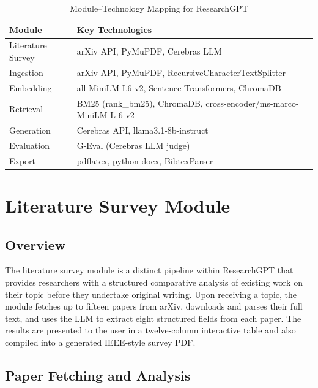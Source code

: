 \documentclass[12pt, a4paper]{article}
\begin{document}
\begin{table}[h]
  \centering
  \caption{Module--Technology Mapping for ResearchGPT}
  \label{tab:modules}
  \begin{tabularx}{\linewidth}{lX}
    \toprule
    \textbf{Module} & \textbf{Key Technologies} \\
    \midrule
    Literature Survey   & arXiv API, PyMuPDF, Cerebras LLM \\
    Ingestion           & arXiv API, PyMuPDF, RecursiveCharacterTextSplitter \\
    Embedding           & all-MiniLM-L6-v2, Sentence Transformers, ChromaDB \\
    Retrieval           & BM25 (rank\_bm25), ChromaDB, cross-encoder/ms-marco-MiniLM-L-6-v2 \\
    Generation          & Cerebras API, llama3.1-8b-instruct \\
    Evaluation          & G-Eval (Cerebras LLM judge) \\
    Export              & pdflatex, python-docx, BibtexParser \\
    \bottomrule
  \end{tabularx}
\end{table}

\section{Literature Survey Module}

\subsection{Overview}

The literature survey module is a distinct pipeline within ResearchGPT that
provides researchers with a structured comparative analysis of existing work on
their topic before they undertake original writing. Upon receiving a topic, the
module fetches up to fifteen papers from arXiv, downloads and parses their full
text, and uses the LLM to extract eight structured fields from each paper. The
results are presented to the user in a twelve-column interactive table and also
compiled into a generated IEEE-style survey PDF.

\subsection{Paper Fetching and Analysis}
\end{document}
